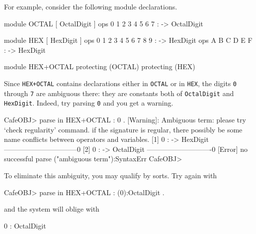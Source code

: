 \documentclass[a4paper]{memoir}
\begin{document}
For example, consider the following module declarations.
\begin{vvtm}
\begin{ccode}
  module OCTAL {
    [ OctalDigit ]
    ops 0 1 2 3 4 5 6 7 : -> OctalDigit
  }

  module HEX {
    [ HexDigit ]
    ops 0 1 2 3 4 5 6 7 8 9 : -> HexDigit
    ops A B C D E F : -> HexDigit
  }

  module HEX+OCTAL {
    protecting (OCTAL)
    protecting (HEX)
  }
\end{ccode}
\end{vvtm}
Since \verb|HEX+OCTAL| contains declarations either in \verb|OCTAL| or in
\verb|HEX|, the digits \verb|0| through \verb|7| are ambiguous there:
they are constants both of \verb|OctalDigit| and \verb|HexDigit|.
Indeed, try parsing \verb|0| and you get a warning.
\begin{vvtm}
\begin{ccode}
  CafeOBJ> parse in HEX+OCTAL : 0 .
  [Warning]: Ambiguous term:
      please try `check regularity' command.
      if the signature is regular, there possibly be 
      some name conflicts between operators and variables.
  [1] 0 :  -> HexDigit --------------------------------0
  [2] 0 :  -> OctalDigit ----------------------------0
  [Error] no successful parse
    ("ambiguous term"):SyntaxErr
  CafeOBJ> 
\end{ccode}
\end{vvtm}
To eliminate this ambiguity, you may qualify by sorts. Try again with
\begin{vvtm}
\begin{ccode}
  CafeOBJ> parse in HEX+OCTAL : (0):OctalDigit .
\end{ccode}
\end{vvtm}
and the system will oblige with
\begin{vvtm}
\begin{ccode}
  0 : OctalDigit
\end{ccode}
\end{vvtm}


\end{document}
